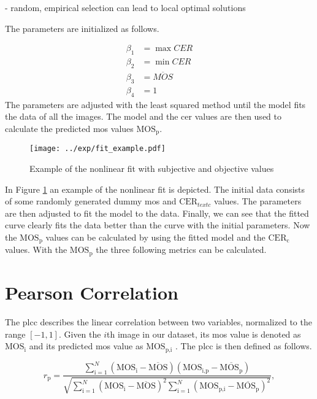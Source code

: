 - random, empirical selection can lead to local optimal solutions

The parameters are initialized as follows.
 
\begin{equation}
    \begin{aligned}
        \beta_{1} &= \max{CER} \\
        \beta_{2} &= \min{CER} \\
        \beta_{3} &= \overline{MOS} \\
        \beta_{4} &= 1
    \end{aligned}
    \label{eq:nonlinear_init}
\end{equation}
The parameters are adjusted with the least squared method until the model fits the data of all the images.
The model and the \gls{cer} values are then used to calculate the predicted \gls{mos} values $\text{MOS}_{\text{p}}$.

\begin{figure}[h]
    \centering
    \texttt{[image: ../exp/fit\_example.pdf]}
    \caption{Example of the nonlinear fit with subjective and objective values}
    \label{fig:nonlinear_fit}
\end{figure}

In Figure \ref{fig:nonlinear_fit} an example of the nonlinear fit is depicted.
The initial data consists of some randomly generated dummy \gls{mos} and $\text{CER}_{text{c}}$ values.
The parameters are then adjusted to fit the model to the data.
Finally, we can see that the fitted curve clearly fits the data better than the curve with the initial parameters.
Now the $\text{MOS}_{\text{p}}$ values can be calculated by using the fitted model and the $\text{CER}_{\text{c}}$ values.
With the $\text{MOS}_{\text{p}}$ the three following metrics \cite{iqa_survey_2021} can be calculated.

\section{Pearson Correlation}
\label{sec:pearson}

The \gls{plcc} \cite{pears_spear_2016} describes the linear correlation between two variables, normalized to the range $[-1, 1]$.
Given the $i$th image in our dataset, its \gls{mos} value is denoted as $\text{MOS}_{\text{i}}$ and its predicted \gls{mos} value as $\text{MOS}_{\text{p,i}}$ .
The \gls{plcc} is then defined as follows.

\begin{equation}
    r_{\text{p}} = \frac{\sum_{\text{i}=1}^{N}{(\text{MOS}_{\text{i}}-\overline{\text{MOS}})(\text{MOS}_{\text{i,p}}-\overline{\text{MOS}_{\text{p}}})}}{\sqrt{\sum_{\text{i}=1}^{N}{(\text{MOS}_{\text{i}}-\overline{\text{MOS}})^2}\sum_{\text{i}=1}^{N}{(\text{MOS}_{\text{p,i}}-\overline{\text{MOS}_{\text{p}}})^2}}},
    \label{eq:pearson}
\end{equation}

